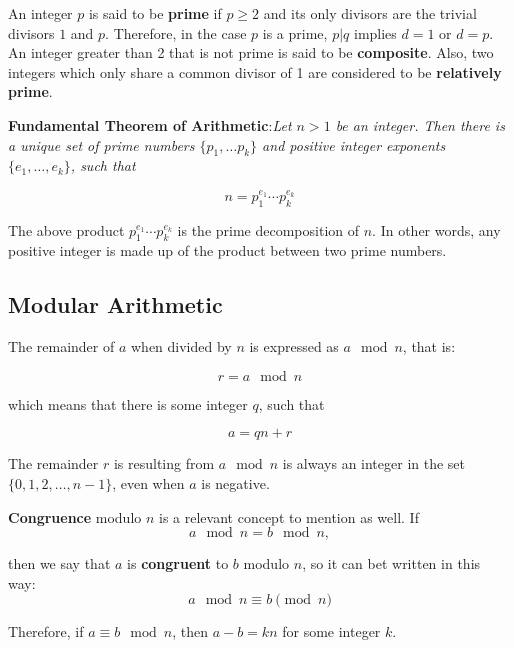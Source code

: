 An integer $p$ is said to be \textbf{prime} if $p\geq 2$ and its only divisors are the trivial divisors $1$ and $p$. Therefore, in the case $p$ is a prime, $p|q$ implies $d=1$ or $d=p$. An integer greater than 2 that is not prime is said to be \textbf{composite}. Also, two integers which only share a common divisor of 1 are considered to be \textbf{relatively prime}.

\textbf{Fundamental Theorem of Arithmetic}:\textit{Let $n > 1$ be an integer. Then there is a unique set of prime numbers $\{p_{1}, \dots p_{k}\}$ and positive integer exponents  $\{e_{1}, \dots , e_{k}\}$, such that}

\begin{equation}
n = p_{1}^{e_{1}} \cdots p_{k}^{e_{k}}
\end{equation}

The above product $p_{1}^{e_{1}} \cdots p_{k}^{e_{k}}$ is the prime decomposition of $n$. In other words, any positive integer is made up of the product between two prime numbers.   

\subsection{Modular Arithmetic}

The remainder of $a$ when divided by $n$ is expressed as $a \mod n$, that is:

\begin{equation}
  r = a \mod n
\end{equation}

which means that there is some integer $q$, such that

\begin{equation}
  a = qn + r
\end{equation}

The remainder $r$ is resulting from $a \mod n$ is always an integer in the set $\{0, 1, 2, \dots, n-1\}$, even when $a$ is negative. 

\textbf{Congruence} modulo $n$ is a relevant concept to mention as well. If
\begin{equation}
  a \mod n = b \mod n,
\end{equation}

then we say that $a$ is \textbf{congruent} to $b$ modulo $n$, so it can bet written in this way:
\begin{equation}
a \mod n \equiv b \pmod n
\end{equation}

Therefore, if $a \equiv b \mod n$, then $a-b=kn$ for some integer $k$. 

